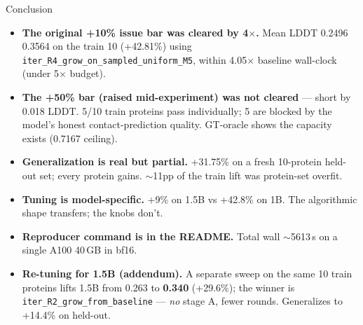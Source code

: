 \documentclass[aspectratio=169,11pt]{beamer}
\newcommand{\codeS}[1]{\texttt{\scriptsize\color{navy}#1}}
\begin{document}
\begin{frame}{Conclusion}
  \begin{itemize}
    \setlength\itemsep{0.4em}
    \item \textbf{The original +10\% issue bar was cleared by 4$\times$.}
          Mean LDDT 0.2496 \textrightarrow{} 0.3564 on the train 10
          (+42.81\%) using \codeS{iter\_R4\_grow\_on\_sampled\_uniform\_M5},
          within 4.05$\times$ baseline wall-clock (under 5$\times$ budget).
    \item \textbf{The +50\% bar (raised mid-experiment) was not cleared}
          --- short by 0.018 LDDT. 5/10 train proteins pass individually;
          5 are blocked by the model's honest contact-prediction quality.
          GT-oracle shows the capacity exists (0.7167 ceiling).
    \item \textbf{Generalization is real but partial.} +31.75\% on a
          fresh 10-protein held-out set; every protein gains.
          $\sim$11pp of the train lift was protein-set overfit.
    \item \textbf{Tuning is model-specific.} +9\% on 1.5B vs +42.8\%
          on 1B. The algorithmic shape transfers; the knobs don't.
    \item \textbf{Reproducer command is in the README.} Total wall
          $\sim$5613\,s on a single A100 40\,GB in bf16.
    \item \textbf{Re-tuning for 1.5B (addendum).} A separate sweep
          on the same 10 train proteins lifts 1.5B from 0.263 to
          \textbf{0.340} (+29.6\%); the winner is
          \codeS{iter\_R2\_grow\_from\_baseline} — \emph{no} stage A,
          fewer rounds. Generalizes to +14.4\% on held-out.
  \end{itemize}
\end{frame}
\end{document}
